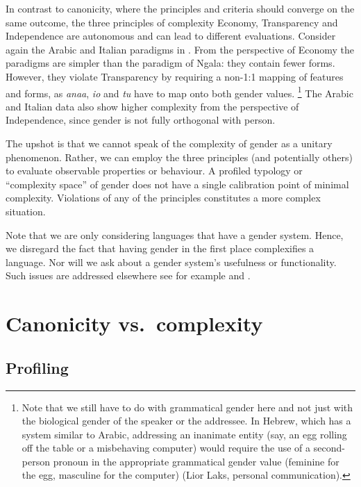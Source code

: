 \documentclass[output=collectionpaper]{langsci/langscibook}
\begin{document}
In contrast to canonicity, where the principles and criteria should converge on the same outcome, the three principles of complexity \textendash{} Economy, Transparency and Independence \textendash{} are autonomous and can lead to different evaluations. Consider again the Arabic and Italian paradigms in . From the perspective of Economy the paradigms are simpler than the paradigm of Ngala: they contain fewer forms. However, they violate Transparency by requiring a non-1:1 mapping of features and forms, as \textit{anaa}, \textit{io} and \textit{tu} have to map onto both gender values.%
\footnote{Note that we still have to do with grammatical gender here and not just with the biological gender of the speaker or the addressee. In Hebrew, which has a system similar to Arabic, addressing an inanimate entity (say, an egg rolling off the table or a misbehaving computer) would require the use of a second-person pronoun in the appropriate grammatical gender value (feminine for the egg, masculine for the computer) (Lior Laks, personal communication).} %
The Arabic and Italian data also show higher complexity from the perspective of Independence, since gender is not fully orthogonal with person.

The upshot is that we cannot speak of the complexity of gender as a unitary phenomenon. Rather, we can employ the three principles (and potentially others) to evaluate observable properties or behaviour. A profiled typology or ``complexity space'' of gender does not have a single calibration point of minimal complexity. Violations of any of the principles constitutes a more complex situation.

Note that we are only considering languages that have a gender system. Hence, we disregard the fact that having gender in the first place complexifies a language. Nor will we ask about a gender system's usefulness or functionality. Such issues are addressed elsewhere \textendash{} see for example  and .

\section{Canonicity vs.\ complexity}
\label{sec:Audr:3}

\subsection{Profiling}
\end{document}
